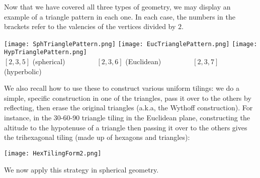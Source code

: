 \documentclass[leqno]{book}
\begin{document}
Now that we have covered all three types of geometry, we may display an example of a triangle pattern in each one.  In each case, the numbers in the brackets refer to the valencies of the vertices divided by $2$.
\begin{center}
\texttt{[image: SphTrianglePattern.png]}
\texttt{[image: EucTrianglePattern.png]}
\texttt{[image: HypTrianglePattern.png]}\\
$[2,3,5]$ (spherical)~~~~~~~~~$[2,3,6]$ (Euclidean)~~~~~~~~~$[2,3,7]$ (hyperbolic)
\end{center}
We also recall how to use these to construct various uniform tilings: we do a simple, specific construction in one of the triangles, pass it over to the others by reflecting, then erase the original triangles (a.k.a, the Wythoff construction).  For instance, in the 30-60-90 triangle tiling in the Euclidean plane, constructing the altitude to the hypotenuse of a triangle then passing it over to the others gives the trihexagonal tiling (made up of hexagons and triangles):
\begin{center}
\texttt{[image: HexTilingForm2.png]} %
\end{center}
We now apply this strategy in spherical geometry.
\end{document}
